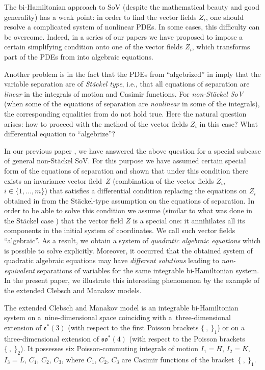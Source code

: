 \documentclass[pdftex]{sigma}
\numberwithin{equation}{section}
\begin{document}
The bi-Hamiltonian approach to SoV (despite the mathematical beauty and good generality) has a weak point: in order to find the vector fields $Z_i$, one should resolve a complicated system of nonlinear PDEs. In some cases, this difficulty can be overcome. Indeed, in a series of our papers \cite{MagSkr, SkrJGP2019, SkrSto, SkrBD} we have proposed to impose a certain simplifying condition onto one of the vector fields $Z_i$, which transforms part of the PDEs from \cite{MFP,FP,FP2} into algebraic equations.

Another problem is in the fact that
the PDEs from \cite{MFP,FP,FP2} ``algebrized'' in \cite{MagSkr, SkrJGP2019, SkrSto, SkrBD} imply that the variable separation are of {\it St\"ackel type}, i.e., that all equations of separation are {\it linear} in the integrals of motion and Casimir functions. For {\it non-St\"ackel SoV} (when some of the equations of separation are {\it nonlinear} in some of the integrals), the corresponding equalities from \cite{MFP,FP,FP2} do not hold true.
Here the natural question arises: how to proceed with the method of the vector fields $Z_i$ in this case? What differential equation to ``algebrize''?


In our previous paper \cite{SkrAsSoVExCle}, we have answered the above question for a special subcase of general non-St\"ackel SoV.
For this purpose we have assumed certain special form of the equations of separation
and shown
that under this condition there exists an invariance vector field~$Z$ (combination of the vector fields $Z_i$, $i\in \{1,\dots, m\}$)
 that satisfies a differential condition replacing the equations on $Z_i$ obtained in \cite{MFP,FP,FP2} from the St\"ackel-type assumption on the equations of separation.
In order to be able to solve this condition we assume (similar to what was done in the St\"ackel case \cite{MagSkr, SkrJGP2019, SkrSto, SkrBD}) that the vector field $Z$ is a special one: it annihilates all its components in the initial system of coordinates. We call such vector fields ``algebraic''. As a result, we obtain a system of {\it quadratic algebraic equations} which is possible to solve explicitly. Moreover, it occurred that the obtained system of quadratic algebraic equations may have {\it different solutions} leading to {\it non-equivalent} separations of variables for the same integrable bi-Hamiltonian system. In the present paper, we illustrate this interesting phenomenon by the example of the extended Clebsch and Manakov models.

The extended Clebsch and Manakov model is an integrable
 bi-Hamiltonian system on a~nine-dimensional space coinciding with a~three-dimensional extension of $\mathfrak{e}^*(3)$ (with respect to the first Poisson brackets $\{\ ,\ \}_1$) or on a three-dimensional extension of $\mathfrak{so}^*(4)$ (with respect to the Poisson brackets $\{\ ,\ \}_2$). It possesses six Poisson-commuting integrals of motion $I_1=H$, $I_2=K$, $I_3=L$, $C_1$, $C_2$, $C_3$, where $C_1$, $C_2$, $C_3$ are Casimir functions of the bracket~$\{\ ,\ \}_1$.
\end{document}
